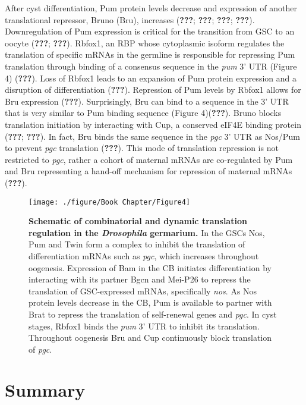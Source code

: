 \documentclass[12pt,oneside]{reedthesis}
\begin{document}
After cyst differentiation, Pum protein levels decrease and expression
of another translational repressor, Bruno (Bru), increases
({\textbf{???}}; {\textbf{???}}; {\textbf{???}}; {\textbf{???}}). Downregulation of Pum expression is
critical for the transition from GSC to an oocyte
({\textbf{???}}; {\textbf{???}}). Rbfox1, an RBP whose
cytoplasmic isoform regulates the translation of specific mRNAs in the
germline is responsible for repressing Pum translation through binding
of a consensus sequence in the \emph{pum} 3' UTR (Figure 4)
({\textbf{???}}). Loss of Rbfox1 leads to an expansion of Pum
protein expression and a disruption of differentiation
({\textbf{???}}). Repression of Pum levels by Rbfox1 allows
for Bru expression ({\textbf{???}}). Surprisingly, Bru can
bind to a sequence in the 3' UTR that is very similar to Pum binding
sequence (Figure 4)({\textbf{???}}). Bruno blocks translation
initiation by interacting with Cup, a conserved eIF4E binding protein
({\textbf{???}}; {\textbf{???}}). In fact, Bru binds the same sequence in
the \emph{pgc} 3' UTR as Nos/Pum to prevent \emph{pgc} translation
({\textbf{???}}). This mode of translation repression is not restricted
to \emph{pgc}, rather a cohort of maternal mRNAs are co-regulated by Pum and
Bru representing a hand-off mechanism for repression of maternal mRNAs
({\textbf{???}}).
\begin{figure}

{\centering \texttt{[image: ./figure/Book Chapter/Figure4]} 

}

\caption[\textbf{Schematic of combinatorial and dynamic translation regulation in the \emph{Drosophila} germarium.}]{\textbf{Schematic of combinatorial and dynamic translation regulation in the \emph{Drosophila} germarium.} In the GSCs Nos, Pum and Twin form a complex to inhibit the translation of differentiation mRNAs such as \emph{pgc}, which increases throughout oogenesis. Expression of Bam in the CB initiates differentiation by interacting with its partner Bgcn and Mei-P26 to repress the translation of GSC-expressed mRNAs, specifically \emph{nos}. As Nos protein levels decrease in the CB, Pum is available to partner with Brat to repress the translation of self-renewal genes and \emph{pgc}. In cyst stages, Rbfox1 binds the \emph{pum} 3' UTR to inhibit its translation. Throughout oogenesis Bru and Cup continuously block translation of \emph{pgc}.}\label{fig:unnamed-chunk-5}
\end{figure}
\hypertarget{summary}{%
\section{Summary}\label{summary}}
\end{document}
